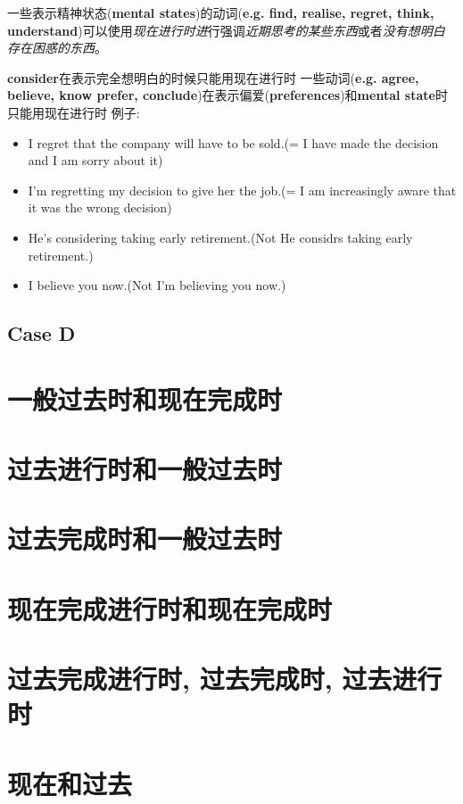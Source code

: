 \noindent
一些表示精神状态({\bf mental states})的动词({\bf e.g. {\color{word}find, realise, regret, think,%
understand}})可以使用\emph{现在进行时进}行强调\emph{近期思考的某些东西}或者\emph{没有想明白存在困惑的东西}。\par

\noindent
{\bf consider}在表示完全想明白的时候只能用现在进行时\newline
一些动词({\bf e.g. {\color{word}agree, believe, know prefer, conclude}})在表示偏爱({\bf preferences})和{\bf mental state}时只能用现在进行时\newline
\smallskip
例子:\newline

\begin{itemize}
\item {\example I regret that the company will have to be sold.(= I have made the decision%
and I am sorry about it)}
\item {\example I'm regretting my decision to give her the job.(= I am increasingly aware that it was the wrong decision)}
\item {\example He's considering taking early retirement.(Not He considrs taking early retirement.)}
\item {\example I believe you now.(Not I'm believing you now.)}
\end{itemize}

\subsection{Case D}



\section{一般过去时和现在完成时}

\section{过去进行时和一般过去时}

\section{过去完成时和一般过去时}

\section{现在完成进行时和现在完成时}

\section{过去完成进行时, 过去完成时, 过去进行时}

\section{现在和过去}
